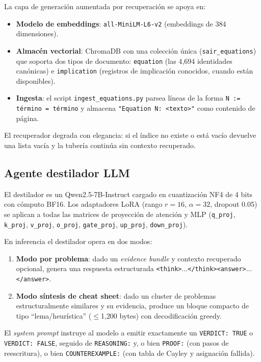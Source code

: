 \documentclass{article}
\begin{document}
La capa de generaci\'on aumentada por recuperaci\'on se apoya en:
\begin{itemize}[itemsep=1pt]
  \item \textbf{Modelo de embeddings}: \texttt{all-MiniLM-L6-v2} (embeddings de 384 dimensiones).
  \item \textbf{Almac\'en vectorial}: ChromaDB con una colecci\'on \'unica (\texttt{sair\_equations}) que soporta dos tipos de documento: \texttt{equation} (las 4{,}694 identidades can\'onicas) e \texttt{implication} (registros de implicaci\'on conocidos, cuando est\'an disponibles).
  \item \textbf{Ingesta}: el script \texttt{ingest\_equations.py} parsea l\'ineas de la forma \texttt{N := t\'ermino = t\'ermino} y almacena \texttt{"Equation N: <texto>"} como contenido de p\'agina.
\end{itemize}

El recuperador degrada con elegancia: si el \'indice no existe o est\'a vac\'io devuelve una lista vac\'ia y la tuber\'ia contin\'ua sin contexto recuperado.

\subsection{Agente destilador LLM}
\label{sec:distiller}

El destilador es un Qwen2.5-7B-Instruct cargado en cuantizaci\'on NF4 de 4 bits con c\'omputo BF16. Los adaptadores LoRA (rango $r{=}16$, $\alpha{=}32$, dropout 0.05) se aplican a todas las matrices de proyecci\'on de atenci\'on y MLP (\texttt{q\_proj}, \texttt{k\_proj}, \texttt{v\_proj}, \texttt{o\_proj}, \texttt{gate\_proj}, \texttt{up\_proj}, \texttt{down\_proj}).

En inferencia el destilador opera en dos modos:
\begin{enumerate}[label=(\roman*),itemsep=1pt]
  \item \textbf{Modo por problema}: dado un \textit{evidence bundle} y contexto recuperado opcional, genera una respuesta estructurada \texttt{<think>}$\dots$\texttt{</think><answer>}$\dots$\texttt{</answer>}.
  \item \textbf{Modo s\'intesis de cheat sheet}: dado un cluster de problemas estructuralmente similares y su evidencia, produce un bloque compacto de tipo ``lema/heur\'istica'' ($\leq$1{,}200 bytes) con decodificaci\'on greedy.
\end{enumerate}

El \textit{system prompt} instruye al modelo a emitir exactamente un \texttt{VERDICT: TRUE} o \texttt{VERDICT: FALSE}, seguido de \texttt{REASONING:} y, o bien \texttt{PROOF:} (con pasos de reescritura), o bien \texttt{COUNTEREXAMPLE:} (con tabla de Cayley y asignaci\'on fallida).
\end{document}
